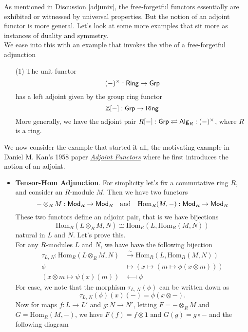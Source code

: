 \begin{example}\label{notfreeforget}
As mentioned in Discussion \ref{adjuniv}, the free-forgetful functors essentially are exhibited or witnessed by universal properties. But the notion of an adjoint functor is more general. Let's look at some more examples that sit more as instances of duality and symmetry.\\[0.5em]
We ease into this with an example that invokes the vibe of a free-forgetful adjunction
\begin{itemize}
\item[(1)] The unit functor \[(-)^\times:\mathsf{Ring} \to \mathsf{Grp}\]
has a left adjoint given by the group ring functor \[\mathbb Z[-]:\mathsf{Grp} \to \mathsf{Ring}\]
More generally, we have the adjoint pair $R[-]:\mathsf{Grp} \rightleftarrows \mathsf{Alg}_R:(-)^\times$, where $R$ is a ring.
\end{itemize}
We now consider the example that started it all, the motivating example in Daniel M. Kan's 1958 paper \href{https://www.jstor.org/stable/1993102}{\color{darkblue}\emph{Adjoint Functors}} where he first introduces the notion of an adjoint.
\begin{itemize}[itemsep=1em]
\item \textbf{Tensor-Hom Adjunction}. For simplicity let's fix a commutative ring $R$, and consider an $R$-module $M$. Then we have two functors
\[- \otimes_R M:\mathsf{Mod}_R \to \mathsf{Mod}_R \quad \text{and} \quad \mathrm{Hom}_R(M,-):\mathsf{Mod}_R \to \mathsf{Mod}_R\]
These two functors define an adjoint pair, that is we have bijections
\[\mathrm{Hom}_R(L\otimes_R M,N) \cong \mathrm{Hom}_R(L,\mathrm{Hom}_R(M,N))\]
natural in $L$ and $N$. Let's prove this.\\[0.5em]
For any $R$-modules $L$ and $N$, we have have the following bijection
\begin{align*}
\tau_{L,\,N}:\mathrm{Hom}_R(L\otimes_R M,N) &\overset{\sim}{\longrightarrow} \mathrm{Hom}_R(L,\mathrm{Hom}_R(M,N))\\[0.5em]
\phi &\longmapsto (x \mapsto (m \mapsto \phi(x \otimes m)))\\[0.5em]
(x \otimes m \mapsto \psi(x)(m))&\longmapsfrom \psi 
\end{align*}
For ease, we note that the morphism $\tau_{L,\,N}(\phi)$ can be written down as \[\tau_{L,\,N}(\phi)(x)(-) = \phi(x\otimes-).\]
Now for maps $f: L \to L'$ and $g:N \to N'$, letting $F = -\otimes_R M$ and $G = \mathrm{Hom}_R(M,-)$, we have $F(f) = f\otimes 1$ and $G(g) = g\circ -$ and the following diagram

\end{itemize}
\end{example}
